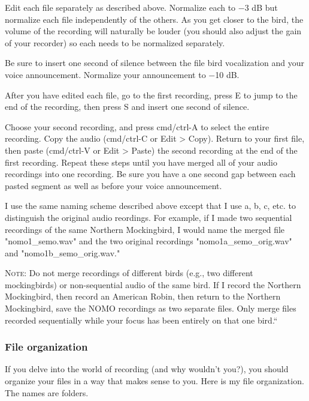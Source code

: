 \documentclass[12pt]{article}
\begin{document}
Edit each file separately as described above. Normalize each to $-$3 dB but normalize each file independently of the others. As you get closer to the bird, the volume of the recording will naturally be louder (you should also adjust the gain of your recorder) so each needs to be normalized separately.

Be sure to insert one second of silence between the file bird vocalization and your voice announcement. Normalize your announcement to $-$10 dB.

After you have edited each file, go to the first recording, press E to jump to the end of the recording, then press S and insert one second of silence. 

Choose your second recording, and press cmd/ctrl-A to select the entire recording. Copy the audio (cmd/ctrl-C or Edit > Copy). Return to your first file, then paste (cmd/ctrl-V or Edit > Paste) the second recording at the end of the first recording. Repeat these steps until you have merged all of your audio recordings into one recording. Be sure you have a one second gap between each pasted segment as well as before your voice announcement.

I use the same naming scheme described above except that I use a, b, c, etc. to distinguish the original audio reordings. For example, if I made two sequential recordings of the same Northern Mockingbird, I would name the merged file "nomo1\_semo.wav" and the two original recordings "nomo1a\_semo\_orig.wav" and "nomo1b\_semo\_orig.wav."

\textsc{Note:} Do not merge recordings of different birds (e.g., two different mockingbirds) or non-sequential audio of the same bird. If I record the Northern Mockingbird, then record an American Robin, then return to the Northern Mockingbird, save the NOMO recordings as two separate files. Only merge files recorded sequentially while your focus has been entirely on that one bird.``


\subsubsection*{File organization}

If you delve into the world of recording (and why wouldn't you?), you should organize your files in a way that makes sense to you.  Here is my file organization. The names are folders.
\end{document}
